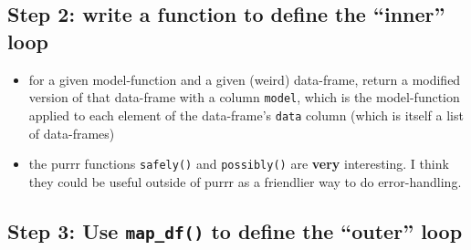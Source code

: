 \documentclass[]{book}
\newenvironment{Shaded}{\begin{snugshade}}{\end{snugshade}}
\newcommand{\CommentTok}[1]{\textcolor[rgb]{0.56,0.35,0.01}{\textit{#1}}}
\newcommand{\ControlFlowTok}[1]{\textcolor[rgb]{0.13,0.29,0.53}{\textbf{#1}}}
\newcommand{\KeywordTok}[1]{\textcolor[rgb]{0.13,0.29,0.53}{\textbf{#1}}}
\newcommand{\NormalTok}[1]{#1}
\newcommand{\OperatorTok}[1]{\textcolor[rgb]{0.81,0.36,0.00}{\textbf{#1}}}
\newcommand{\OtherTok}[1]{\textcolor[rgb]{0.56,0.35,0.01}{#1}}
\newcommand{\StringTok}[1]{\textcolor[rgb]{0.31,0.60,0.02}{#1}}
\begin{document}
\hypertarget{step-2-write-a-function-to-define-the-inner-loop}{%
\subsection{Step 2: write a function to define the ``inner'' loop}\label{step-2-write-a-function-to-define-the-inner-loop}}

\begin{Shaded}
\end{Shaded}

\begin{itemize}
\item
  for a given model-function and a given (weird) data-frame, return a modified version of that data-frame with a column \texttt{model}, which is the model-function applied to each element of the data-frame's \texttt{data} column (which is itself a list of data-frames)
\item
  the purrr functions \texttt{safely()} and \texttt{possibly()} are \textbf{very} interesting. I think they could be useful outside of purrr as a friendlier way to do error-handling.
\end{itemize}

\hypertarget{step-3-use-map_df-to-define-the-outer-loop}{%
\subsection{\texorpdfstring{Step 3: Use \texttt{map\_df()} to define the ``outer'' loop}{Step 3: Use map\_df() to define the ``outer'' loop}}\label{step-3-use-map_df-to-define-the-outer-loop}}

\begin{Shaded}
\end{Shaded}
\end{document}
